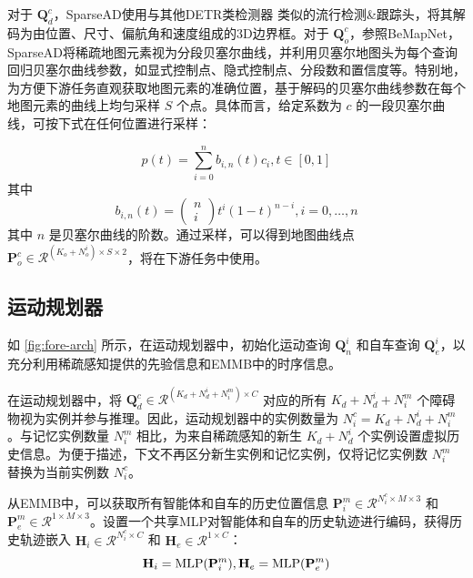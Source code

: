 对于 $\mathbf{Q}^c_d$，SparseAD使用与其他DETR类检测器\cite{liu2022petr,yan2023cross,jiang2023far3d,zhang2023fully} 类似的流行检测\&跟踪头，将其解码为由位置、尺寸、偏航角和速度组成的3D边界框。对于 $\mathbf{Q}^c_o$，参照BeMapNet\cite{qiao2023end}，SparseAD将稀疏地图元素视为分段贝塞尔曲线，并利用贝塞尔地图头为每个查询回归贝塞尔曲线参数，如显式控制点、隐式控制点、分段数和置信度等。特别地，为方便下游任务直观获取地图元素的准确位置，基于解码的贝塞尔曲线参数在每个地图元素的曲线上均匀采样 $S$ 个点。具体而言，给定系数为 $c$ 的一段贝塞尔曲线，可按下式在任何位置进行采样：

\begin{equation}
p(t)=\sum_{i=0}^n b_{i, n}(t) c_i, t \in[0,1]
\label{eq:bezier_eq_1}
\end{equation}
其中
\begin{equation}
b_{i, n}(t)=\left(\begin{array}{c}
n \\
i
\end{array}\right) t^i(1-t)^{n-i}, i=0, \ldots, n
\label{eq:bezier_eq_2}
\end{equation}
其中 $n$ 是贝塞尔曲线的阶数。通过采样，可以得到地图曲线点 $\mathbf{P}^c_o\in\mathcal{R}^{(K_o+N^i_o)\times S \times 2}$，将在下游任务中使用。

\subsection{运动规划器}
\label{appendix-imple-motionplanner}

如 \cref{fig:fore-arch} 所示，在运动规划器中，初始化运动查询 $\mathbf{Q}^i_n$ 和自车查询 $\mathbf{Q}^i_e$，以充分利用稀疏感知提供的先验信息和EMMB中的时序信息。

在运动规划器中，将 $\mathbf{Q}^c_d \in \mathcal{R}^{(K_d+N^i_d+N^m_i)\times C}$ 对应的所有 $K_d+N^i_d+N^m_i$ 个障碍物视为实例并参与推理。因此，运动规划器中的实例数量为 $N^c_i = K_d+N^i_d+N^m_i$。与记忆实例数量 $N^m_i$ 相比，为来自稀疏感知的新生 $K_d+N^i_d$ 个实例设置虚拟历史信息。为便于描述，下文不再区分新生实例和记忆实例，仅将记忆实例数 $N^m_i$ 替换为当前实例数 $N^c_i$。

从EMMB中，可以获取所有智能体和自车的历史位置信息 $\mathbf{P}^m_i\in\mathcal{R}^{N^c_i \times M \times 3}$ 和 $\mathbf{P}^m_e\in\mathcal{R}^{1 \times M \times 3}$。设置一个共享MLP对智能体和自车的历史轨迹进行编码，获得历史轨迹嵌入 $\textbf{H}_i\in\mathcal{R}^{N^c_i \times C}$ 和 $\textbf{H}_e\in\mathcal{R}^{1 \times C}$：
\begin{equation}
{{\mathbf{H}}_i} = {\rm{MLP}}({\mathbf{P}}_i^m), {{\mathbf{H}}_e} = {\rm{MLP}}({\mathbf{P}}_e^m)
\end{equation}

